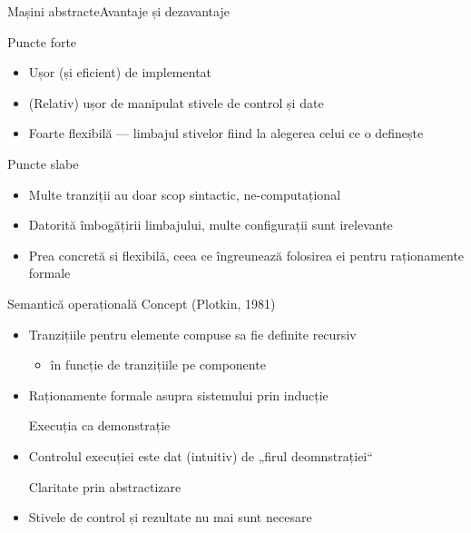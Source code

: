 
\begin{frame}{Mașini abstracte}{Avantaje și dezavantaje}
\begin{block}{Puncte forte}
\begin{itemize}
\item Ușor (și eficient) de implementat
\item (Relativ) ușor de manipulat stivele de control și date
\item Foarte flexibilă --- limbajul stivelor fiind la alegerea celui ce o definește
\end{itemize}
\end{block}
\vfill
\begin{block}{Puncte slabe}
\begin{itemize}
\item Multe tranziții au doar scop sintactic, ne-computațional
\item Datorită îmbogățirii limbajului, multe configurații sunt irelevante 
\item Prea concretă si flexibilă, ceea ce îngreunează folosirea ei pentru raționamente formale
\end{itemize}
\end{block}
\end{frame}

\begin{frame}{Semantică operațională }
{Concept (Plotkin, 1981) }

\begin{itemize}
\vitem Definiția sistemului de tranziție trebuie să reflecte structura limbajului
\item Tranzițiile pentru elemente compuse sa fie definite recursiv 
\begin{itemize}
\item în funcție de tranzițiile pe componente
\end{itemize}
\item Raționamente formale asupra sistemului prin inducție


\vitem Execuția ca demonstrație 
\item Controlul execuției este dat (intuitiv) de „firul deomnstrației“

\vitem Claritate prin abstractizare
\item Stivele de control și rezultate nu mai sunt necesare
\end{itemize}
\end{frame}

